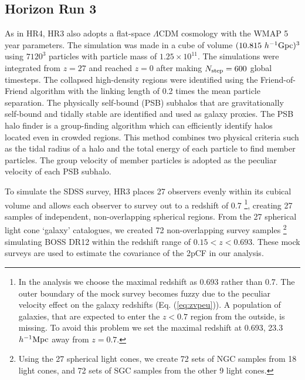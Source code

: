 \documentclass[iop]{emulateapj}
\newcommand{\hMsun}{{\ifmmode{h^{-1}{\rm
        {M_{\odot}}}}\else{$h^{-1}{\rm{M_{\odot}}}$~}\fi}}
\begin{document}
\subsection{Horizon Run 3}

As in HR4, HR3 also adopts a flat-space $\Lambda$CDM cosmology with the WMAP 5 year parameters.
The simulation was made in a cube of volume $(10.815\  h^{-1}{\rm{Gpc}})^3$
using $7120^3$ particles with particle mass of $1.25\times 10^{11}$\hMsun.
The simulations were integrated from $z=27$ and reached $z=0$ after making $N_{\rm step}=600$ global timesteps.
The collapsed high-density regions were identified using the Friend-of-Friend algorithm with the linking length of 0.2 times the mean particle separation.
The physically self-bound (PSB) subhalos that are gravitationally self-bound and tidally stable \citep{kim and park 2006} 
are identified and used as galaxy proxies.
The PSB halo finder is a group-finding algorithm which can efficiently identify halos located even in crowded regions. 
This method combines two physical criteria such as the tidal radius of a halo and the total energy of each particle to find member particles.
The group velocity of member particles is adopted as the peculiar velocity of each PSB subhalo.


To simulate the SDSS survey,
HR3 places 27 observers evenly within its cubical volume and allows
each observer to survey out to a redshift of 0.7
\footnote{In the analysis we choose the maximal redshift as 0.693 rather than 0.7. 
The outer boundary of the mock survey becomes fuzzy due to the peculiar velocity effect 
on the galaxy redshifts (Eq. (\ref{eq:zvpeu})).
A population of galaxies, that are expected to enter the $z<0.7$ region from the outside, is missing.
To avoid this problem we set the maximal redshift at 0.693, 
23.3 $h^{-1}{\rm Mpc}$ away from $z=0.7$.}, 
creating 27 samples of independent, non-overlapping spherical regions.
From the 27 spherical light cone `galaxy' catalogues, 
we created 72 non-overlapping survey samples 
\footnote{Using the 27 spherical light cones, we create 72 sets of NGC samples from 18 light cones, 
and 72 sets of SGC samples from the other 9 light cones.}
simulating BOSS DR12 within the redshift range of $0.15< z< 0.693$.
These mock surveys are used to estimate the covariance of the 2pCF in our analysis.
\end{document}
